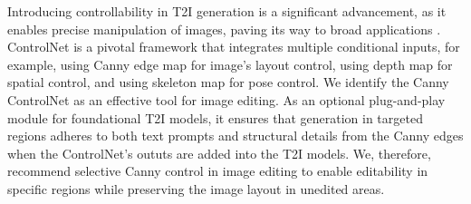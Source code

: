\documentclass{article}
\begin{document}
Introducing controllability in T2I generation is a significant advancement, as it enables precise manipulation of images, paving its way to broad applications \citep{zhang2023adding,li2024controlnet++,li2024unimo,zhao2023uni}. ControlNet \citep{zhang2023adding} is a pivotal framework that integrates multiple conditional inputs, for example, using Canny edge map for image's layout control, using depth map for spatial control, and using skeleton map for pose control. We identify the Canny ControlNet as an effective tool for image editing. As an optional plug-and-play module for foundational T2I models, it ensures that generation in targeted regions adheres to both text prompts and structural details from the Canny edges  \citep{canny1986computational} when the ControlNet's oututs are added into the T2I models. We, therefore, recommend selective Canny control in image editing to enable editability in specific regions while preserving the image layout in unedited areas.










 
\end{document}
